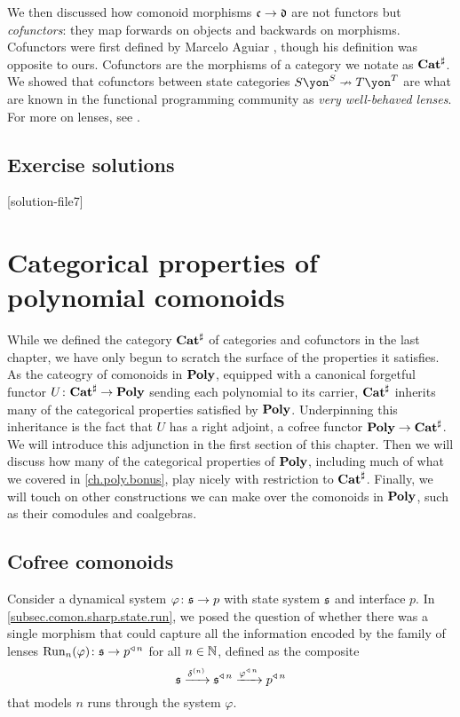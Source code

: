 \documentclass[Book-Poly]{subfiles}
\begin{document}
We then discussed how comonoid morphisms $\mathfrak{c}\to\mathfrak{d}$ are not functors but \emph{cofunctors}: they map forwards on objects and backwards on morphisms. Cofunctors were first defined by Marcelo Aguiar \cite{aguiar1997internal}, though his definition was opposite to ours. Cofunctors are the morphisms of a category we notate as $\mathbf{Cat}^\sharp$. We showed that cofunctors between state categories $S\yon^S\cof T\yon^T$ are what are known in the functional programming community as \emph{very well-behaved lenses}. For more on lenses, see \cite{nlab2022lens}.


\section{Exercise solutions}
{\footnotesize
}

[solution-file7]

\chapter{Categorical properties of polynomial comonoids} \label{ch.comon.cofree}

While we defined the category $\mathbf{Cat}^\sharp$ of categories and cofunctors in the last chapter, we have only begun to scratch the surface of the properties it satisfies.
As the cateogry of comonoids in $\mathbf{Poly}$, equipped with a canonical forgetful functor $U\colon\mathbf{Cat}^\sharp\to\mathbf{Poly}$ sending each polynomial to its carrier, $\mathbf{Cat}^\sharp$ inherits many of the categorical properties satisfied by $\mathbf{Poly}$.
Underpinning this inheritance is the fact that $U$ has a right adjoint, a cofree functor $\mathbf{Poly}\to\mathbf{Cat}^\sharp$.
We will introduce this adjunction in the first section of this chapter.
Then we will discuss how many of the categorical properties of $\mathbf{Poly}$, including much of what we covered in \cref{ch.poly.bonus}, play nicely with restriction to $\mathbf{Cat}^\sharp$.
Finally, we will touch on other constructions we can make over the comonoids in $\mathbf{Poly}$, such as their comodules and coalgebras.

\section{Cofree comonoids} \label{sec.comon.cofree.cons}

Consider a dynamical system $\varphi\colon\mathfrak{s}\to p$ with state system $\mathfrak{s}$ and interface $p$.
In \cref{subsec.comon.sharp.state.run}, we posed the question of whether there was a single morphism that could capture all the information encoded by the family of lenses $\text{Run}_n(\varphi)\colon\mathfrak{s}\to p^{\mathbin{\triangleleft}\,n}$ for all $n\in\mathbb{N}$, defined as the composite
\[
    \mathfrak{s}\xrightarrow{\delta^{(n)}}\mathfrak{s}^{\mathbin{\triangleleft}\,n}\xrightarrow{\varphi^{\mathbin{\triangleleft}\,n}}p^{\mathbin{\triangleleft}\,n}
\]
that models $n$ runs through the system $\varphi$.
\end{document}
